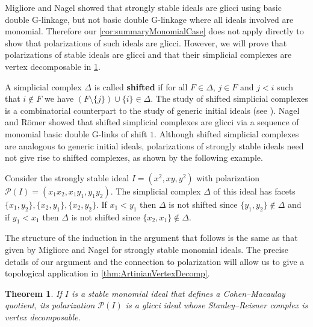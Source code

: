 \documentclass[12pt, reqno]{amsart}
\numberwithin{equation}{section}
\newtheorem{theorem}{Theorem}[section]
\newtheorem{Main Conjecture}[theorem]{Main Conjecture}
\theoremstyle{definition}
\newenvironment{example}
  {\pushQED{\qed}\renewcommand{\qedsymbol}{$\diamondsuit$}\examplex}
  {\popQED\endexamplex}
\theoremstyle{plain}
\renewcommand{\P}{\mathcal{P}}
\begin{document}
Migliore and Nagel \cite[Theorem 3.5]{MN02} showed that strongly stable ideals are glicci using basic double G-linkage, but not basic double G-linkage where all ideals involved are monomial. Therefore our \cref{cor:summaryMonomialCase} does not apply directly to show that polarizations of such ideals are glicci. However, we will prove that polarizations of stable ideals are glicci and that their simplicial complexes are vertex decomposable in \cref{thm:StableVertexDecomp}. 
 
A simplicial complex $\Delta$ is called {\bf shifted} if for all $F \in \Delta$, $j \in F$ and $j < i$ such that $i \not\in F$ we have $(F \setminus \{j\}) \cup \{i\} \in \Delta$. The study of shifted simplicial complexes is a combinatorial counterpart to the study of generic initial ideals (see \cite{AHH98}). Nagel and R\"omer \cite{NR08} showed that shifted simplicial complexes are glicci via a sequence of monomial basic double G-links of shift $1$. Although shifted simplicial complexes are analogous to generic initial ideals, polarizations of strongly stable ideals need not give rise to shifted complexes, as shown by the following example.

\begin{example}
Consider the strongly stable ideal $I=(x^2,xy, y^2)$ with polarization $\P(I)=(x_1x_2,x_1y_1,y_1y_2)$. The simplicial complex $\Delta$ of this ideal has facets $\{x_1,y_2\},\{x_2,y_1\},\{x_2,y_2\}$.  If $x_1<y_1$ then $\Delta$ is not shifted since $\{y_1,y_2\}\not\in \Delta$ and if $y_1<x_1$ then $\Delta$ is not shifted since $\{x_2,x_1\}\not\in \Delta$.
\end{example}

The structure of the induction in the argument that follows is the same as that given by Migliore and Nagel \cite{MN02} for strongly stable monomial ideals. The precise details of our argument and the connection to polarization will allow us to give a topological application in \cref{thm:ArtinianVertexDecomp}.


\begin{theorem}\label{thm:StableVertexDecomp}
    If $I$ is a stable monomial ideal that defines a Cohen--Macaulay quotient, its polarization $\P(I)$ is a glicci ideal whose Stanley--Reisner complex is vertex decomposable. 
\end{theorem}
\end{document}
